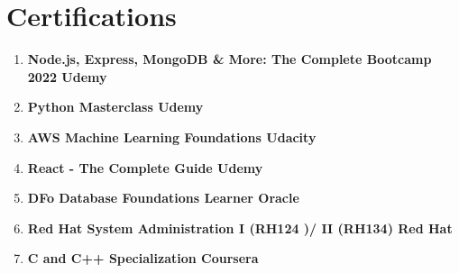 \documentclass[10pt]{article}
\newcommand{\rside}[1]{
  \hfill {\small\color{accent} #1}%
}
\begin{document}
\section{Certifications}
\begin{enumerate}[label=\null, left=0pt..0pt, itemsep=0pt]
  \item \textbf{Node.js, Express, MongoDB \& More: The Complete Bootcamp 2022\rside{Udemy}}
  \item \textbf{Python Masterclass \rside{Udemy}}
  \item \textbf{AWS Machine Learning Foundations\rside{Udacity}}
  \item \textbf{React - The Complete Guide \rside{Udemy}}
  \item \textbf{DFo Database Foundations Learner \rside{Oracle}}
  \item \textbf{Red Hat System Administration I (RH124 )/ II (RH134) \rside{Red Hat}}
  \item \textbf{C and C++ Specialization \rside{Coursera}}
\end{enumerate}


\end{document}
